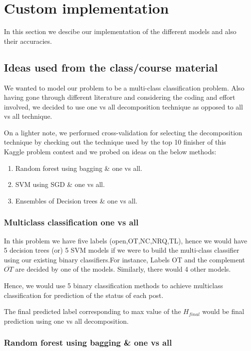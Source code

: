\documentclass[letterpaper,twocolumn,11pt]{article}
\begin{document}
\section{Custom implementation}

In this section we descibe our implementation of the different models and also their accuracies.

\subsection{Ideas used from the class/course material}
We wanted to model our problem to be a multi-class classification problem. Also having gone through different literature and considering the coding and effort involved, we decided to use one vs all decomposition technique as opposed to all vs all technique.

On a lighter note, we performed cross-validation for selecting the decomposition technique by checking out the technique used by the top 10 finisher of this Kaggle problem contest and we probed on ideas on the below methods:
\begin{enumerate}
\itemsep0em
\item Random forest using bagging \& one vs all.
\item SVM using SGD \& one vs all.
\item Ensembles of Decision trees \& one vs all.
\end{enumerate}

\subsubsection{Multiclass classification one vs all}
In this problem we have five labels (open,OT,NC,NRQ,TL), hence we would have 5 decision trees (or) 5 SVM models if we were to build the multi-class classifier using our existing binary classifiers.For instance, Labels OT and the complement $\overline{OT}$ are decided by one of the models. Similarly, there would 4 other models. 

Hence, we would use 5 binary classification methods to achieve multiclass classification for prediction of the status of each post.

The final predicted label corresponding to max value of the $H_{final}$ would be final prediction using one vs all decomposition.

\subsubsection{Random forest using bagging \& one vs all}
\end{document}
